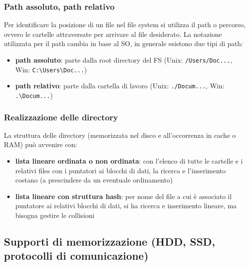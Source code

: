 \documentclass[a4paper]{article}
\begin{document}
\subsubsection*{Path assoluto, path relativo}
Per identificare la posizione di un file nel file system si utilizza il path o percorso, ovvero le cartelle attraversate per
arrivare al file desiderato. La notazione utilizzata per il path cambia in base al SO, in generale esistono due tipi di path:
\begin{itemize}
	\item \textbf{path assoluto}: parte dalla root directory del FS (Unix: \verb|/Users/Doc...|, Win: \verb|C:\Users\Doc...|)
	\item \textbf{path relativo}: parte dalla cartella di lavoro (Unix: \verb|./Docum...|, Win: \verb|.\Docum...|)
\end{itemize}

\subsubsection*{Realizzazione delle directory}
La struttura delle directory (memorizzata nel disco e all'occorrenza in cache o RAM) può avvenire con:
\begin{itemize}
	\item \textbf{lista lineare ordinata o non ordinata}: con l'elenco di tutte le cartelle e i relativi files con i puntatori 
	ai blocchi di dati, la ricerca e l'inserimento costano (a prescindere da un eventuale ordinamento)
	\item \textbf{lista lineare con struttura hash}:  per nome del file a cui è associato il puntatore ai relativi
	blocchi di dati, si ha ricerca e inserimento lineare, ma bisogna gestire le collisioni
\end{itemize}

\newpage


\subsection{Supporti di memorizzazione (HDD, SSD, protocolli di comunicazione)}
\end{document}
